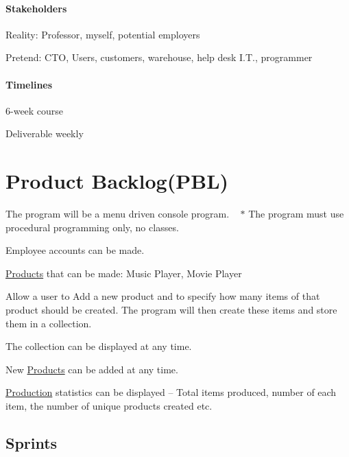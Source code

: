 \paragraph*{Stakeholders}


\begin{DoxyItemize}
\item Reality\+: Professor, myself, potential employers
\item Pretend\+: C\+TO, Users, customers, warehouse, help desk I.\+T., programmer \paragraph*{Timelines}
\end{DoxyItemize}


\begin{DoxyItemize}
\item 6-\/week course
\item Deliverable weekly
\end{DoxyItemize}

\section*{Product Backlog(\+P\+B\+L)}


\begin{DoxyItemize}
\item The program will be a menu driven console program. ~\newline
 $\ast$ The program must use procedural programming only, no classes.
\item Employee accounts can be made.
\item \mbox{\hyperlink{struct_products}{Products}} that can be made\+: Music Player, Movie Player
\item Allow a user to Add a new product and to specify how many items of that product should be created. The program will then create these items and store them in a collection.
\item The collection can be displayed at any time.
\item New \mbox{\hyperlink{struct_products}{Products}} can be added at any time.
\item \mbox{\hyperlink{struct_production}{Production}} statistics can be displayed – Total items produced, number of each item, the number of unique products created etc.
\end{DoxyItemize}

\subsection*{Sprints}

